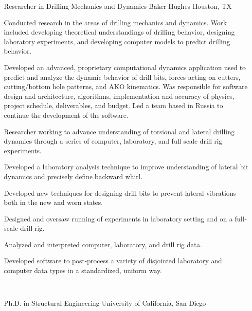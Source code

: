 \documentclass{leresume}
\begin{document}
            {Researcher in Drilling Mechanics and Dynamics}
            {Baker Hughes}
			{Houston, TX}
			
					\noindent 
				Conducted research in the areas of drilling mechanics and dynamics.  Work included developing theoretical understandings of drilling behavior, designing laboratory experiments, and developing computer models to predict drilling behavior.
			
		\begin{bulletedlist}
			
		\item 
					Developed an advanced, proprietary computational dynamics application used to predict and analyze the dynamic behavior of drill bits, forces acting on cutters, cutting/bottom hole patterns, and AKO kinematics.  Was responsible for software design and architecture, algorithms, implementation and accuracy of physics, project schedule, deliverables, and budget.  Led a team based in Russia to continue the development of the software.
		\item Researcher working to advance understanding of torsional and lateral drilling dynamics through a series of computer, laboratory, and full scale drill rig experiments.
		\item Developed a laboratory analysis technique to improve understanding of lateral bit dynamics and precisely define backward whirl.
		\item Developed new techniques for designing drill bits to prevent lateral vibrations both in the new and worn states.
		\item Designed and oversaw running of experiments in laboratory setting and on a full-scale drill rig.
		\item Analyzed and interpreted computer, laboratory, and drill rig data.
		\item Developed software to post-process a variety of disjointed laboratory and computer data types in a standardized, uniform way.
		\end{bulletedlist}
			\vspace*{-12pt}
	\hspace*{0pt}\\ \vspace*{-2pt}
				
		\vspace*{-8pt}
	

	
                {Ph.D. in Structural Engineering}
                {University of California, San Diego}
		
\end{document}
